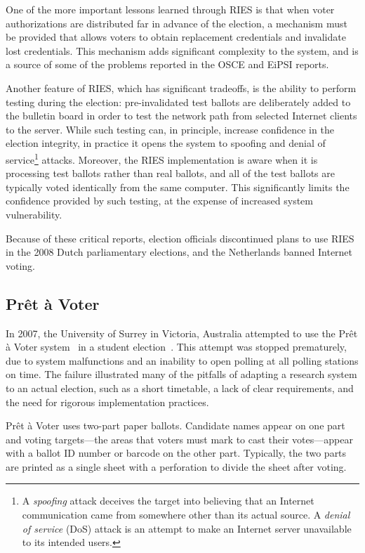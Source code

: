 One of the more important lessons learned through RIES is that when
voter authorizations are distributed far in advance of the election, a
mechanism must be provided that allows voters to obtain replacement
credentials and invalidate lost credentials. This mechanism adds
significant complexity to the system, and is a source of some of the
problems reported in the OSCE and EiPSI reports.

Another feature of RIES, which has significant tradeoffs, is the
ability to perform testing during the election: pre-invalidated test
ballots are deliberately added to the bulletin board in order to test
the network path from selected Internet clients to the server. While
such testing can, in principle, increase confidence in the election
integrity, in practice it opens the system to spoofing and denial of
service\footnote{A \emph{spoofing} attack deceives the target into
  believing that an Internet communication came from somewhere other
  than its actual source. A \emph{denial of service} (DoS) attack is
  an attempt to make an Internet server unavailable to its intended
  users.} attacks. Moreover, the RIES implementation is aware when it
is processing test ballots rather than real ballots, and all of the
test ballots are typically voted identically from the same
computer. This significantly limits the confidence provided by such
testing, at the expense of increased system vulnerability.

Because of these critical reports, election officials discontinued
plans to use RIES in the 2008 Dutch parliamentary elections, and the
Netherlands banned Internet voting.

\subsection{Prêt à Voter}
\label{sec:pret-voter}

In 2007, the University of Surrey in Victoria, Australia attempted to
use the Prêt à Voter system~\cite{chaum2005, burton2012} in a student
election~\cite{bismark2007}. This attempt was stopped prematurely, due
to system malfunctions and an inability to open polling at all polling
stations on time. The failure illustrated many of the pitfalls of
adapting a research system to an actual election, such as a short
timetable, a lack of clear requirements, and the need for rigorous
implementation practices.

Prêt à Voter uses two-part paper ballots. Candidate names appear on
one part and voting targets---the areas that voters must mark to cast
their votes---appear with a ballot ID number or barcode on the other
part. Typically, the two parts are printed as a single sheet with a
perforation to divide the sheet after voting.

